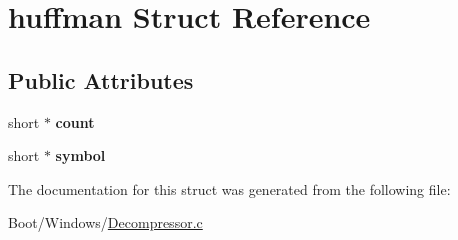 \hypertarget{structhuffman}{}\section{huffman Struct Reference}
\label{structhuffman}
\subsection*{Public Attributes}
\begin{DoxyCompactItemize}
\item 
\mbox{\label{structhuffman_abd5352fbe25a5dcd9b39d1fad5af36b8}} 
short $\ast$ {\bfseries count}
\item 
\mbox{\label{structhuffman_ad73a1c0a3fde1066a0d9838ccf2c9245}} 
short $\ast$ {\bfseries symbol}
\end{DoxyCompactItemize}


The documentation for this struct was generated from the following file\+:\begin{DoxyCompactItemize}
\item 
Boot/\+Windows/\hyperlink{_decompressor_8c}{Decompressor.\+c}\end{DoxyCompactItemize}
